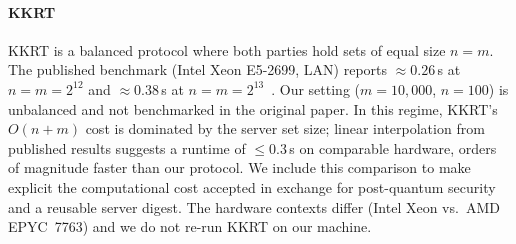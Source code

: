 \documentclass[preprint,12pt]{elsarticle}
\begin{document}
\begin{table}[t]
\centering
\caption{Protocol comparison at $m = 10{,}000$ server records.
Ours and ALOS22 use $n=100$; KKRT uses $n=m$; HE-PSI is discussed
separately at a different workload (see text).
$^*$Measured on AMD EPYC~7763 (96~cores, 256\,GB RAM).
$^\dagger$From published benchmarks; hardware differs (see text).
$^\ddagger$KKRT is balanced ($m=n$); published at $n=m=2^{14}$; the
unbalanced setting ($m\gg n$) is not benchmarked in~\cite{kolesnikov2016kkrt}.
$^\S$ALOS22 published at $m=4{,}096$, $n=256$, 19~min (Intel i7-7820X, LAN);
extrapolated to $m=10{,}000$, $n=100$ via $O(nm)$ server scaling:
$19 \times (10000/4096) \times (100/256) \approx 18$~min.
$^a$KKRT uses EC-based base OT; a post-quantum variant via lattice OT is
theoretically feasible.
$^b$HE-PSI achieves sublinear communication but inverts the laconic digest role.}
\label{tab:comparison}
\end{table}

\paragraph{KKRT~\cite{kolesnikov2016kkrt}}
KKRT is a balanced protocol where both parties hold sets of equal size $n=m$.
The published benchmark (Intel Xeon E5-2699, LAN) reports $\approx 0.26$\,s
at $n=m=2^{12}$ and $\approx 0.38$\,s at $n=m=2^{13}$~\cite{kolesnikov2016kkrt}.
Our setting ($m=10{,}000$, $n=100$) is unbalanced and not benchmarked in the
original paper. In this regime, KKRT's $O(n+m)$ cost is dominated by the
server set size; linear interpolation from published results suggests a runtime
of $\leq 0.3$\,s on comparable hardware, orders of magnitude faster than our
protocol. We include this comparison to make explicit the computational cost
accepted in exchange for post-quantum security and a reusable server digest.
The hardware contexts differ (Intel Xeon vs.\ AMD EPYC~7763) and we do not
re-run KKRT on our machine.
\end{document}

